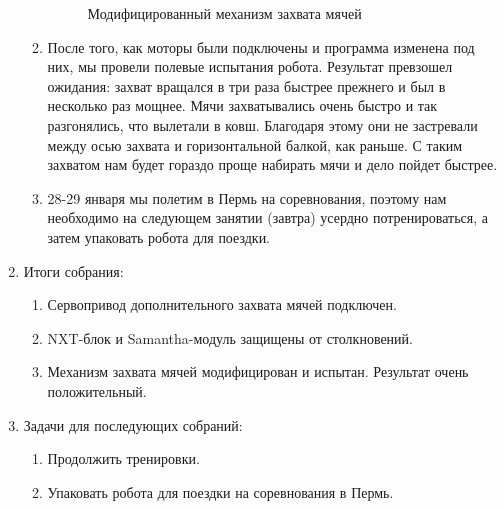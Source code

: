 \begin{enumerate}
\begin{enumerate}
\begin{figure}[H]
\begin{minipage}[h]{0.24\linewidth}
	  	  \end{minipage}
	  	  \caption{Модифицированный механизм захвата мячей}
	   \end{figure}
	   
	   \item После того, как моторы были подключены и программа изменена под них, мы провели полевые испытания робота. Результат превзошел ожидания: захват вращался в три раза быстрее прежнего и был в несколько раз мощнее. Мячи захватывались очень быстро и так разгонялись, что вылетали в ковш. Благодаря этому они не застревали между осью захвата и горизонтальной балкой, как раньше. С таким захватом нам будет гораздо проще набирать мячи и дело пойдет быстрее.
	   
	   \item 28-29 января мы полетим в Пермь на соревнования, поэтому нам необходимо на следующем занятии (завтра) усердно потренироваться, а затем упаковать робота для поездки.

	\end{enumerate}
	
	\item Итоги собрания:
	\begin{enumerate}
		
		\item Сервопривод дополнительного захвата мячей подключен.
		
		\item NXT-блок и Samantha-модуль защищены от столкновений.
		
        \item Механизм захвата мячей модифицирован и испытан. Результат очень положительный.
		
	\end{enumerate}
	
	\item Задачи для последующих собраний:
	\begin{enumerate}
		
		\item Продолжить тренировки.
		
		\item Упаковать робота для поездки на соревнования в Пермь.
			
	\end{enumerate}
\end{enumerate}
\fillpage
